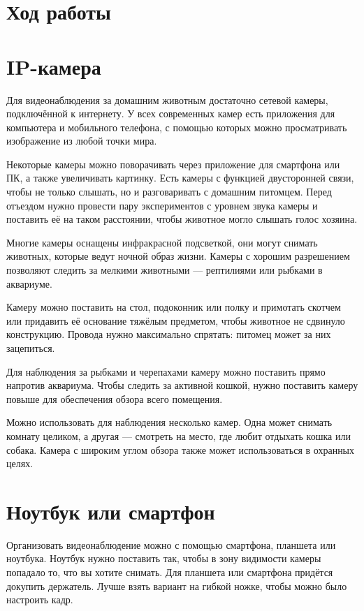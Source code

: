 \section{Ход работы}

\section{IP-камера}

Для видеонаблюдения за домашним животным достаточно сетевой камеры, подключённой к интернету. У всех современных камер есть приложения для компьютера и мобильного телефона, с помощью которых можно просматривать изображение из любой точки мира.

Некоторые камеры можно поворачивать через приложение для смартфона или ПК, а также увеличивать картинку. Есть камеры с функцией двусторонней связи, чтобы не только слышать, но и разговаривать с домашним питомцем. Перед отъездом нужно провести пару экспериментов с уровнем звука камеры и поставить её на таком расстоянии, чтобы животное могло слышать голос хозяина.

Многие камеры оснащены инфракрасной подсветкой, они могут снимать животных, которые ведут ночной образ жизни. Камеры с хорошим разрешением позволяют следить за мелкими животными — рептилиями или рыбками в аквариуме.

Камеру можно поставить на стол, подоконник или полку и примотать скотчем или придавить её основание тяжёлым предметом, чтобы животное не сдвинуло конструкцию. Провода нужно максимально спрятать: питомец может за них зацепиться.

Для наблюдения за рыбками и черепахами камеру можно поставить прямо напротив аквариума. Чтобы следить за активной кошкой, нужно поставить камеру повыше для обеспечения обзора всего помещения.

Можно использовать для наблюдения несколько камер. Одна может снимать комнату целиком, а другая — смотреть на место, где любит отдыхать кошка или собака. Камера с широким углом обзора также может использоваться в охранных целях.



\section{Ноутбук или смартфон}

Организовать видеонаблюдение можно с помощью смартфона, планшета или ноутбука. Ноутбук нужно поставить так, чтобы в зону видимости камеры попадало то, что вы хотите снимать. Для планшета или смартфона придётся докупить держатель. Лучше взять вариант на гибкой ножке, чтобы можно было настроить кадр.

